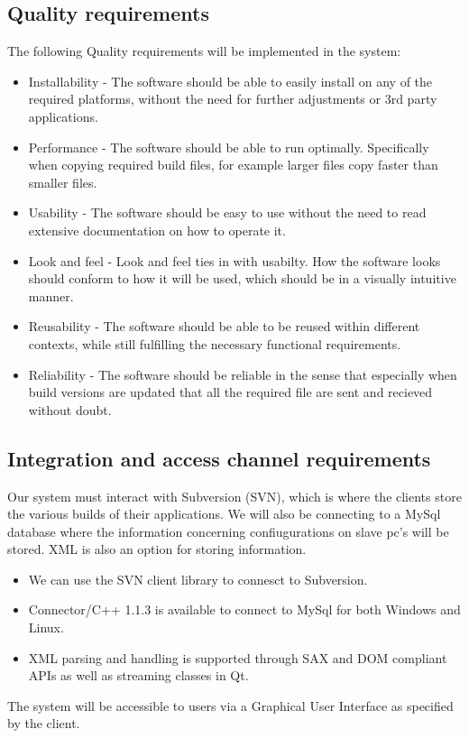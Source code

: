 \documentclass[a4paper,12pt,final]{article}
\begin{document}
\subsection{Quality requirements}
The following Quality requirements will be implemented in the system:
\begin{itemize}
\item Installability - The software should be able to easily install on any of the required platforms, without the need for further adjustments or 3rd party applications.
\item Performance - The software should be able to run optimally. Specifically when copying required build files, for example larger files copy faster than smaller files.
\item Usability - The software should be easy to use without the need to read extensive documentation on how to operate it.
\item Look and feel - Look and feel ties in with usabilty.  How the software looks should conform to how it will be used, which should be in a visually intuitive manner.
\item Reusability - The software should be able to be reused within different contexts, while still fulfilling the necessary functional requirements.
\item Reliability - The software should be reliable in the sense that especially when build versions are updated that all the required file are sent and recieved without doubt.
\end{itemize}
\subsection{Integration and access channel requirements}
Our system must interact with Subversion (SVN), which is where the clients store the various builds of their applications. We will also be connecting to a MySql database where the information concerning confiugurations on slave pc's will be stored. XML is also an option for storing information.
\begin{itemize}
\item We can use the SVN client library to connesct to Subversion.
\item Connector/C++ 1.1.3 is available to connect to MySql for both Windows and Linux.
\item XML parsing and handling is supported through SAX and DOM compliant APIs as well as streaming classes in Qt.
\end{itemize}
The system will be accessible to users via a Graphical User Interface as specified by the client.
\end{document}
